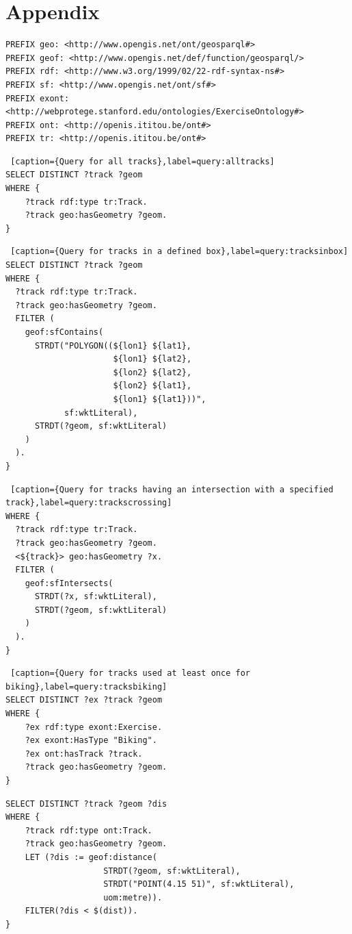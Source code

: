 \documentclass[11pt,a4paper]{scrreprt}
\begin{document}
\chapter*{Appendix}
\begin{lstlisting}[caption={Prefixes used in the hereinbelow queries},label=query:prefixes]
PREFIX geo: <http://www.opengis.net/ont/geosparql#>
PREFIX geof: <http://www.opengis.net/def/function/geosparql/>
PREFIX rdf: <http://www.w3.org/1999/02/22-rdf-syntax-ns#>
PREFIX sf: <http://www.opengis.net/ont/sf#>
PREFIX exont: <http://webprotege.stanford.edu/ontologies/ExerciseOntology#>
PREFIX ont: <http://openis.ititou.be/ont#>
PREFIX tr: <http://openis.ititou.be/ont#>
\end{lstlisting}
\begin{lstlisting} [caption={Query for all tracks},label=query:alltracks]
SELECT DISTINCT ?track ?geom
WHERE {
    ?track rdf:type tr:Track.
    ?track geo:hasGeometry ?geom.
}
\end{lstlisting}

\begin{lstlisting} [caption={Query for tracks in a defined box},label=query:tracksinbox]
SELECT DISTINCT ?track ?geom
WHERE {
  ?track rdf:type tr:Track.
  ?track geo:hasGeometry ?geom.
  FILTER (
    geof:sfContains(
      STRDT("POLYGON((${lon1} ${lat1}, 
      				  ${lon1} ${lat2}, 
      				  ${lon2} ${lat2}, 
      				  ${lon2} ${lat1}, 
      				  ${lon1} ${lat1}))", 
      	    sf:wktLiteral),
      STRDT(?geom, sf:wktLiteral)
    )
  ).
}
\end{lstlisting}

\begin{lstlisting} [caption={Query for tracks having an intersection with a specified track},label=query:trackscrossing]
WHERE {
  ?track rdf:type tr:Track.
  ?track geo:hasGeometry ?geom.
  <${track}> geo:hasGeometry ?x.
  FILTER (
    geof:sfIntersects(
      STRDT(?x, sf:wktLiteral),
      STRDT(?geom, sf:wktLiteral)
    )
  ).
}
\end{lstlisting}
\begin{lstlisting} [caption={Query for tracks used at least once for biking},label=query:tracksbiking]
SELECT DISTINCT ?ex ?track ?geom
WHERE {
    ?ex rdf:type exont:Exercise.
    ?ex exont:HasType "Biking".
    ?ex ont:hasTrack ?track.
    ?track geo:hasGeometry ?geom.
}
\end{lstlisting}

\begin{lstlisting}[caption={Query for tracks within a specified distance of a point }, label = query:tracksdistance ]
SELECT DISTINCT ?track ?geom ?dis
WHERE {
    ?track rdf:type ont:Track.
    ?track geo:hasGeometry ?geom.
    LET (?dis := geof:distance( 
    				STRDT(?geom, sf:wktLiteral), 
    				STRDT("POINT(4.15 51)", sf:wktLiteral),
    				uom:metre)).
    FILTER(?dis < $(dist)).
}
\end{lstlisting}
\end{document}
